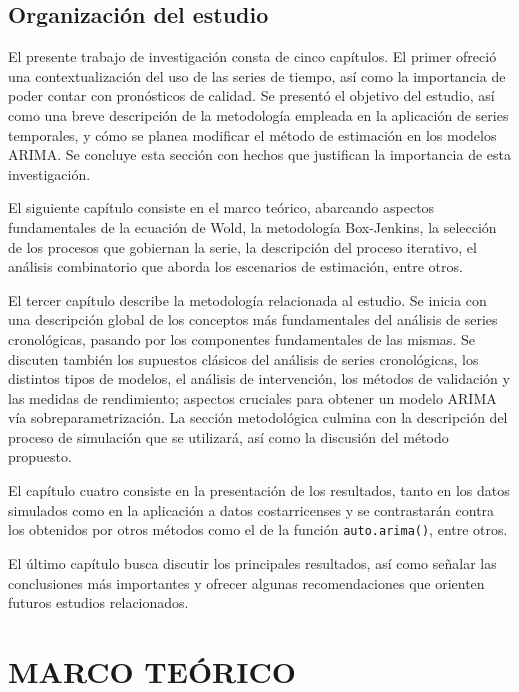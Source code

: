 \documentclass[
]{article}
\begin{document}
\subsection{Organización del estudio}

El presente trabajo de investigación consta de cinco capítulos. El
primer ofreció una contextualización del uso de las series de tiempo,
así como la importancia de poder contar con pronósticos de calidad. Se
presentó el objetivo del estudio, así como una breve descripción de la
metodología empleada en la aplicación de series temporales, y cómo se
planea modificar el método de estimación en los modelos ARIMA. Se
concluye esta sección con hechos que justifican la importancia de esta
investigación.

El siguiente capítulo consiste en el marco teórico, abarcando aspectos
fundamentales de la ecuación de Wold, la metodología Box-Jenkins, la
selección de los procesos que gobiernan la serie, la descripción del
proceso iterativo, el análisis combinatorio que aborda los escenarios de
estimación, entre otros.

El tercer capítulo describe la metodología relacionada al estudio. Se
inicia con una descripción global de los conceptos más fundamentales del
análisis de series cronológicas, pasando por los componentes
fundamentales de las mismas. Se discuten también los supuestos clásicos
del análisis de series cronológicas, los distintos tipos de modelos, el
análisis de intervención, los métodos de validación y las medidas de
rendimiento; aspectos cruciales para obtener un modelo ARIMA vía
sobreparametrización. La sección metodológica culmina con la descripción
del proceso de simulación que se utilizará, así como la discusión del
método propuesto.

El capítulo cuatro consiste en la presentación de los resultados, tanto
en los datos simulados como en la aplicación a datos costarricenses y se
contrastarán contra los obtenidos por otros métodos como el de la
función \texttt{auto.arima()}, entre otros.

El último capítulo busca discutir los principales resultados, así como
señalar las conclusiones más importantes y ofrecer algunas
recomendaciones que orienten futuros estudios relacionados.

\newpage

\section{MARCO TEÓRICO}
\end{document}

